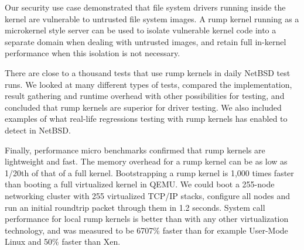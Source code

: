 Our security use case demonstrated that file system drivers running
inside the kernel are vulnerable to untrusted file system images.
A rump kernel running as a microkernel style server can be used to
isolate vulnerable kernel code into a separate domain when dealing
with untrusted images, and retain full in-kernel performance when
this isolation is not necessary.

There are close to a thousand tests that use rump kernels in daily
NetBSD test runs.  We looked at many different types of tests,
compared the implementation, result gathering and runtime overhead
with other possibilities for testing, and concluded that rump
kernels are superior for driver testing.  We also included examples
of what real-life regressions testing with rump kernels has enabled
to detect in NetBSD.

Finally, performance micro benchmarks confirmed that rump kernels
are lightweight and fast.  The memory overhead for a rump kernel
can be as low as 1/20th of that of a full kernel.  Bootstrapping
a rump kernel is 1,000 times faster than booting a full virtualized
kernel in QEMU.  We could boot a 255-node networking cluster with
255 virtualized TCP/IP stacks, configure all nodes and run an
initial roundtrip packet through them in 1.2 seconds.  System call
performance for local rump kernels is better than with any other
virtualization technology, and was measured to be 6707\% faster
than for example User-Mode Linux and 50\% faster than Xen.
